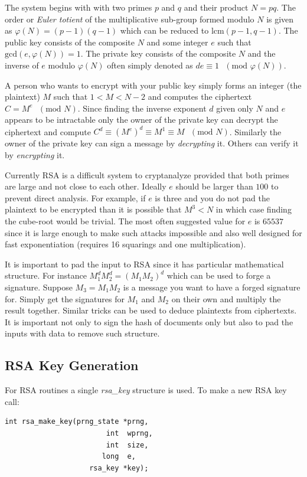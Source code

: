 \documentclass[synpaper]{book}
\def\phi{\varphi}
\begin{document}
The system begins with with two primes $p$ and $q$ and their product $N = pq$.  The order or \textit{Euler totient} of the
multiplicative sub-group formed modulo $N$ is given as $\phi(N) = (p - 1)(q - 1)$ which can be reduced to
$\mbox{lcm}(p - 1, q - 1)$.  The public key consists of the composite $N$ and some integer $e$ such that
$\mbox{gcd}(e, \phi(N)) = 1$.  The private key consists of the composite $N$ and the inverse of $e$ modulo $\phi(N)$
often simply denoted as $de \equiv 1\mbox{ }(\mbox{mod }\phi(N))$.

A person who wants to encrypt with your public key simply forms an integer (the plaintext) $M$ such that
$1 < M < N-2$ and computes the ciphertext $C = M^e\mbox{ }(\mbox{mod }N)$.  Since finding the inverse exponent $d$
given only $N$ and $e$ appears to be intractable only the owner of the private key can decrypt the ciphertext and compute
$C^d \equiv \left (M^e \right)^d \equiv M^1 \equiv M\mbox{ }(\mbox{mod }N)$.  Similarly the owner of the private key
can sign a message by \textit{decrypting} it.  Others can verify it by \textit{encrypting} it.

Currently RSA is a difficult system to cryptanalyze provided that both primes are large and not close to each other.
Ideally $e$ should be larger than $100$ to prevent direct analysis.  For example, if $e$ is three and you do not pad
the plaintext to be encrypted than it is possible that $M^3 < N$ in which case finding the cube-root would be trivial.
The most often suggested value for $e$ is $65537$ since it is large enough to make such attacks impossible and also well
designed for fast exponentiation (requires 16 squarings and one multiplication).

It is important to pad the input to RSA since it has particular mathematical structure.  For instance
$M_1^dM_2^d = (M_1M_2)^d$ which can be used to forge a signature.  Suppose $M_3 = M_1M_2$ is a message you want
to have a forged signature for.  Simply get the signatures for $M_1$ and $M_2$ on their own and multiply the result
together.  Similar tricks can be used to deduce plaintexts from ciphertexts.  It is important not only to sign
the hash of documents only but also to pad the inputs with data to remove such structure.

\subsection{RSA Key Generation}

For RSA routines a single \textit{rsa\_key} structure is used.  To make a new RSA key call:
\begin{verbatim}
int rsa_make_key(prng_state *prng,
                        int  wprng,
                        int  size,
                       long  e,
                    rsa_key *key);
\end{verbatim}
\end{document}
